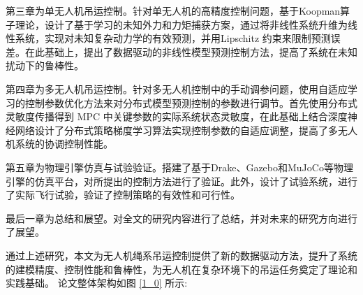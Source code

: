 \documentclass[lang=chs, degree=master, blindreview=true, winfonts=true]{yanputhesis}
\begin{document}
第三章为单无人机吊运控制。针对单无人机的高精度控制问题，基于Koopman算子理论，设计了基于学习的未知外力和力矩捕获方案，通过将非线性系统升维为线性系统，实现对未知复杂动力学的有效预测，并用Lipschitz 约束来限制预测误差。在此基础上，提出了数据驱动的非线性模型预测控制方法，提高了系统在未知扰动下的鲁棒性。

第四章为多无人机吊运控制。针对多无人机控制中的手动调参问题，使用自适应学习的控制参数优化方法来对分布式模型预测控制的参数进行调节。首先使用分布式灵敏度传播得到 MPC 中关键参数的实际系统状态灵敏度，在此基础上结合深度神经网络设计了分布式策略梯度学习算法实现控制参数的自适应调整，提高了多无人机系统的协调控制性能。

第五章为物理引擎仿真与试验验证。搭建了基于Drake、Gazebo和MuJoCo等物理引擎的仿真平台，对所提出的控制方法进行了验证。此外，设计了试验系统，进行了实际飞行试验，验证了控制策略的有效性和可行性。

最后一章为总结和展望。对全文的研究内容进行了总结，并对未来的研究方向进行了展望。

通过上述研究，本文为无人机绳系吊运控制提供了新的数据驱动方法，提升了系统的建模精度、控制性能和鲁棒性，为无人机在复杂环境下的吊运任务奠定了理论和实践基础。
论文整体架构如图 \ref{1_0} 所示:
\end{document}
